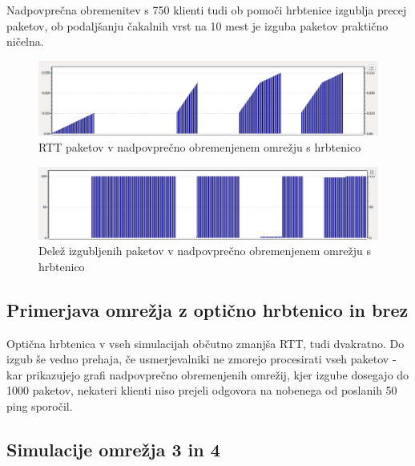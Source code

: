 \documentclass[11pt, a4paper, slovene]{book}
\begin{document}
\pagebreak

Nadpovprečna obremenitev s 750 klienti tudi ob pomoči hrbtenice izgublja precej paketov, ob podaljšanju čakalnih vrst na 10 mest je izguba paketov praktično ničelna.

\begin{figure}[h]
	\centering
	\includegraphics[width=\textwidth]{hRtt2.png}
	\caption{RTT paketov v nadpovprečno obremenjenem omrežju s hrbtenico}
	\label{RTT6}	
\end{figure}

\begin{figure}[h]
	\centering
	\includegraphics[width=\textwidth]{hLoss2.png}
	\caption{Delež izgubljenih paketov v nadpovprečno obremenjenem omrežju s hrbtenico}
	\label{hPL2}	
\end{figure}

\subsection{Primerjava omrežja z optično hrbtenico in brez} 
Optična hrbtenica v vseh simulacijah občutno zmanjša RTT, tudi dvakratno. Do izgub še vedno prehaja, če usmerjevalniki ne zmorejo procesirati vseh paketov - kar prikazujejo grafi nadpovprečno obremenjenih omrežij, kjer izgube dosegajo do 1000 paketov, nekateri klienti niso prejeli odgovora na nobenega od poslanih 50 ping sporočil.

\subsection{Simulacije omrežja 3 in 4}
\end{document}

